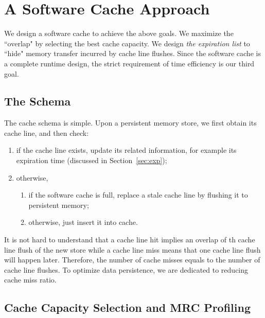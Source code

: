 \documentclass[preprint,nocopyrightspace,10pt]{sigplanconf}
\begin{document}

\section{A Software Cache Approach}

We design a software cache to achieve the above goals. We maximize the ``overlap" 
by selecting the best cache capacity. We design \emph{the expiration list} to ``hide" memory
transfer incurred by cache line flushes. Since the software cache is a complete runtime 
design, the strict requirement of time efficiency is our third goal.

\subsection{The Schema}
The cache schema is simple. Upon a persistent memory store, we first obtain its cache line, and then check:
\begin{enumerate}
\item if the cache line exists, update its related information, for example its expiration time (discussed in Section~\ref{sec:exp});
\item otherwise,
\begin{enumerate}
\item if the software cache is full, replace a stale cache line by flushing it to persistent memory; 
\item otherwise, just insert it into cache.
\end{enumerate}

\end{enumerate}

It is not hard to understand that a cache line hit implies an overlap of th cache line flush of the new store 
while a cache line miss means that one cache line flush will happen later. Therefore, the number of cache 
misses equals to the number of cache line flushes. To optimize data persistence, we are dedicated to reducing
cache miss ratio.

\subsection{Cache Capacity Selection and MRC Profiling}
\end{document}
